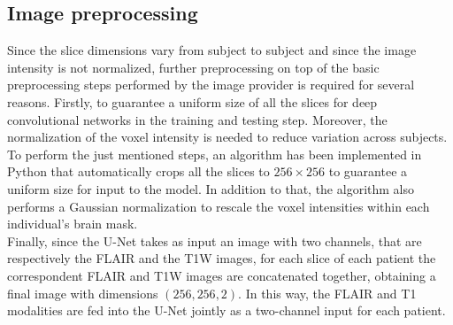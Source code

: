\documentclass[12pt]{extarticle}
\begin{document}
\subsection{Image preprocessing}
Since the slice dimensions vary from subject to subject and since the image intensity is not normalized, further preprocessing on top of the basic preprocessing steps performed by the image provider is required for several reasons.
Firstly, to guarantee a uniform size of all the slices for deep convolutional networks in the training and testing step. Moreover, the normalization of the voxel intensity is needed to reduce variation across subjects. \\
To perform the just mentioned steps, an algorithm has been implemented in Python that automatically crops all the slices to $256\times256$ to guarantee a uniform size for input to the model. In addition to that, the algorithm also performs a Gaussian normalization to rescale the voxel intensities within each individual's brain mask. \\
Finally, since the U-Net takes as input an image with two channels, that are respectively the FLAIR and the T1W images, for each slice of each patient the correspondent FLAIR and T1W images are concatenated together, obtaining a final image with dimensions $(256, 256, 2)$. In this way, the FLAIR and T1 modalities are fed into the U-Net jointly as a two-channel input for each patient.
\end{document}
